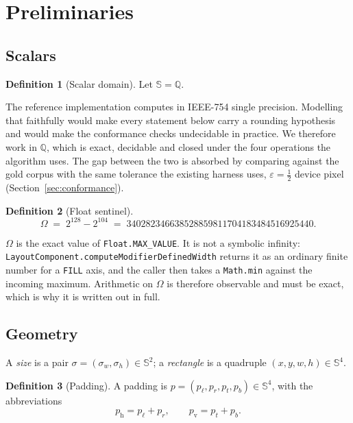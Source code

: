 \documentclass[11pt,a4paper]{article}
\newcommand{\Sc}{\mathbb{S}}
\newcommand{\Om}{\Omega}
\newcommand{\jv}[1]{\texttt{#1}}       %
\theoremstyle{definition}
\newtheorem{definition}{Definition}[section]
\theoremstyle{plain}
\theoremstyle{remark}
\begin{document}
\section{Preliminaries}

\subsection{Scalars}

\begin{definition}[Scalar domain]
Let $\Sc = \mathbb{Q}$.
\end{definition}

The reference implementation computes in IEEE-754 single precision. Modelling
that faithfully would make every statement below carry a rounding hypothesis and
would make the conformance checks undecidable in practice. We therefore work in
$\mathbb{Q}$, which is exact, decidable and closed under the four operations the
algorithm uses. The gap between the two is absorbed by comparing against the
gold corpus with the same tolerance the existing harness uses,
$\varepsilon = \tfrac12$ device pixel (Section~\ref{sec:conformance}).

\begin{definition}[Float sentinel]
\[
  \Om \;=\; 2^{128} - 2^{104} \;=\; 340282346638528859811704183484516925440 .
\]
\end{definition}

$\Om$ is the exact value of \jv{Float.MAX\_VALUE}. It is not a symbolic
infinity: \jv{LayoutComponent.computeModifierDefinedWidth} returns it as an
ordinary finite number for a \jv{FILL} axis, and the caller then takes a
\jv{Math.min} against the incoming maximum. Arithmetic on $\Om$ is therefore
observable and must be exact, which is why it is written out in full.

\subsection{Geometry}

A \emph{size} is a pair $\sigma = (\sigma_w, \sigma_h) \in \Sc^2$; a
\emph{rectangle} is a quadruple $(x, y, w, h) \in \Sc^4$.

\begin{definition}[Padding]
A padding is $p = (p_\ell, p_r, p_t, p_b) \in \Sc^4$, with the abbreviations
\[
  p_{\mathrm{h}} = p_\ell + p_r, \qquad p_{\mathrm{v}} = p_t + p_b .
\]
\end{definition}
\end{document}
